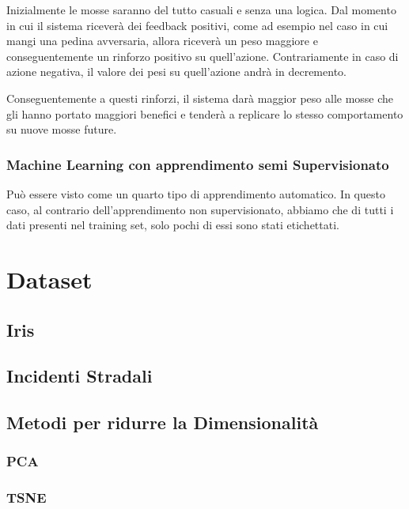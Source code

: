 \documentclass[12pt,italian]{report}
\begin{document}
Inizialmente le mosse saranno del tutto casuali e senza una logica. Dal momento in cui il sistema riceverà dei feedback positivi, come ad esempio nel caso in cui mangi una pedina avversaria, allora riceverà un peso maggiore e conseguentemente un rinforzo positivo su quell’azione. Contrariamente in caso di azione negativa, il valore dei pesi su quell’azione andrà in decremento.

Conseguentemente a questi rinforzi, il sistema darà maggior peso alle mosse che gli hanno portato maggiori benefici e tenderà a replicare lo stesso comportamento su nuove mosse future.
\subsection{Machine Learning con apprendimento semi Supervisionato}
Può essere visto come un quarto tipo di apprendimento automatico. In questo caso, al contrario dell’apprendimento non supervisionato, abbiamo che di tutti i dati presenti nel training set, solo pochi di essi sono stati etichettati.
% 
% 

\chapter{Dataset}


\section{Iris}


\section{Incidenti Stradali}





\section{Metodi per ridurre la Dimensionalità}



\subsection{PCA}
\subsection{TSNE}


% 
% 
\end{document}
